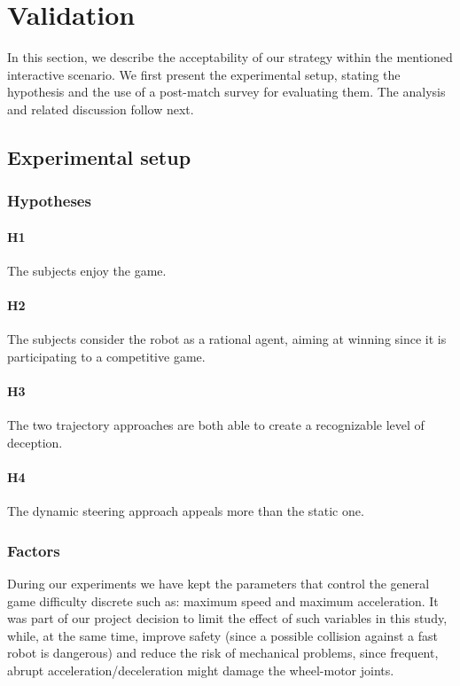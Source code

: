 
\section{Validation}
\label{S:Validation}
In this section, we describe the acceptability of our strategy within the mentioned interactive scenario. We first present the experimental setup, stating the hypothesis and the use of a post-match survey for evaluating them. The analysis and related discussion follow next. 


\subsection{Experimental setup}
\subsubsection{Hypotheses}

\paragraph{H1} The subjects enjoy the game.
\paragraph{H2} The subjects consider the robot as a rational agent, aiming at winning since it is participating to a competitive game.
\paragraph{H3} The two trajectory approaches are both able to create a recognizable level of deception. 
\paragraph{H4} The dynamic steering approach appeals more than the static one.

\subsubsection{Factors}
During our experiments we have kept the parameters that control the general game difficulty discrete such as: maximum speed and maximum acceleration. It was part of our project decision to limit the effect of such variables in this study, while, at the same time, improve safety (since a possible collision against a fast robot is dangerous) and reduce the risk of mechanical problems, since frequent, abrupt acceleration/deceleration might damage the wheel-motor joints.

